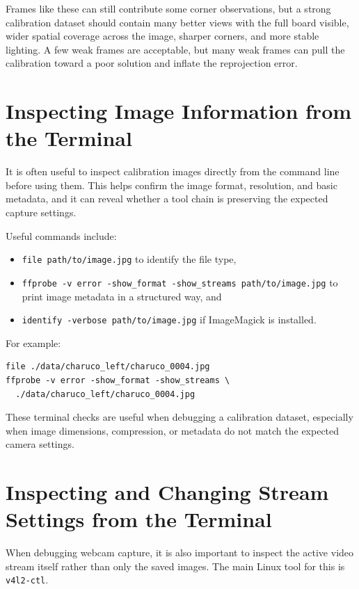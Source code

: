 \documentclass[11pt]{article}
\begin{document}
Frames like these can still contribute some corner observations, but a strong
calibration dataset should contain many better views with the full board
visible, wider spatial coverage across the image, sharper corners, and more
stable lighting. A few weak frames are acceptable, but many weak frames can
pull the calibration toward a poor solution and inflate the reprojection
error.

\section{Inspecting Image Information from the Terminal}

It is often useful to inspect calibration images directly from the command
line before using them. This helps confirm the image format, resolution, and
basic metadata, and it can reveal whether a tool chain is preserving the
expected capture settings.

Useful commands include:

\begin{itemize}
\item \texttt{file path/to/image.jpg} to identify the file type,
\item \texttt{ffprobe -v error -show\_format -show\_streams path/to/image.jpg}
      to print image metadata in a structured way, and
\item \texttt{identify -verbose path/to/image.jpg} if ImageMagick is
      installed.
\end{itemize}

For example:

\begin{verbatim}
file ./data/charuco_left/charuco_0004.jpg
ffprobe -v error -show_format -show_streams \
  ./data/charuco_left/charuco_0004.jpg
\end{verbatim}

These terminal checks are useful when debugging a calibration dataset,
especially when image dimensions, compression, or metadata do not match the
expected camera settings.

\section{Inspecting and Changing Stream Settings from the Terminal}

When debugging webcam capture, it is also important to inspect the active
video stream itself rather than only the saved images. The main Linux tool
for this is \texttt{v4l2-ctl}.
\end{document}

